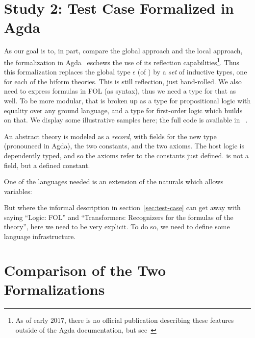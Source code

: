 \documentclass[fleqn]{llncs}
\newcommand{\appendixref}[1]
  {\iftoggle{cicm}
    {appendix #1 of \cite{CaretteFarmerArxiv17}}
    {appendix #1}%
  }
\begin{document}
\section{Study 2: Test Case Formalized in Agda}\label{sec:agda}

As our goal is to, in part, compare the global approach and the local
approach, the formalization in Agda~\cite{Norell09,AgdaWiki} eschews the use of
its reflection capabilities\footnote{As of early $2017$, there is no official
publication describing these features outside of the Agda
documentation, but see~\cite{VanDerWalt12,VanDerWaltSwierstra12}}.
Thus this formalization replaces the global type $\epsilon$ (of
{\churchuqe}) by a \emph{set} of inductive types, one for each of the
biform theories.  This is still reflection, just hand-rolled.  We also
need to express formulas in FOL (as syntax), thus we need a type for
that as well.  To be more modular, that is broken up as a type for
propositional logic with equality over any ground language, and a type
for first-order logic which builds on that.  We display some
illustrative samples here; the full code is available
in~\appendixref{B}.

\iffalse
and at~\cite{agda-code}.
\fi

An abstract theory is modeled as a \emph{record}, with fields for the
new type (pronounced  in Agda), the two constants,
and the two axioms.  The host logic is dependently typed, and so the
axioms refer to the constants just defined.   is not
a field, but a defined constant.

One of the languages needed is an extension of the naturals which
allows variables:



But where the informal description in section~\ref{sec:test-case} can
get away with saying ``Logic: FOL'' and ``Transformers: Recognizers for
the formulas of the theory'', here we need to be very explicit.  To do
so, we need to define some language infrastructure.







\section{Comparison of the Two Formalizations}\label{sec:comparison}
\end{document}
